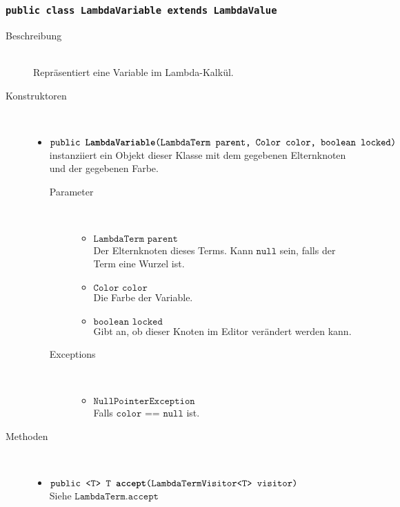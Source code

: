 \subsubsection{\normalfont \texttt{public class \textbf{LambdaVariable} extends LambdaValue}}

\begin{description}
\item[Beschreibung] \hfill \\ Repräsentiert eine Variable im Lambda-Kalkül.

\item[Konstruktoren] \hfill \\
	\vspace{-.8cm}
	\begin{itemize}
		\item $\texttt{public \textbf{LambdaVariable}(LambdaTerm parent, Color color, boolean locked)}$ \\ instanziiert ein Objekt dieser Klasse mit dem gegebenen Elternknoten und der gegebenen Farbe.
		\begin{description}
			\item[Parameter] \hfill \\
			\vspace{-.8cm}
			\begin{itemize}
				\item $\texttt{LambdaTerm parent}$ \\ Der Elternknoten dieses Terms. Kann $\texttt{null}$ sein, falls der Term eine Wurzel ist.
				\item $\texttt{Color color}$ \\ Die Farbe der Variable.
				\item $\texttt{boolean locked}$ \\ Gibt an, ob dieser Knoten im Editor verändert werden kann.
			\end{itemize}
			\item[Exceptions] \hfill \\
			\vspace{-.8cm}
			\begin{itemize}
				\item $\texttt{NullPointerException}$ \\ Falls $\texttt{color == null}$ ist.
			\end{itemize}
		\end{description}
	\end{itemize}
	
\item[Methoden] \hfill \\
	\vspace{-.8cm}
	\begin{itemize}
		\item $\texttt{public <T> T \textbf{accept}(LambdaTermVisitor<T> visitor)}$ \\ Siehe $\texttt{LambdaTerm.accept}$
	\end{itemize}
	

\end{description}
